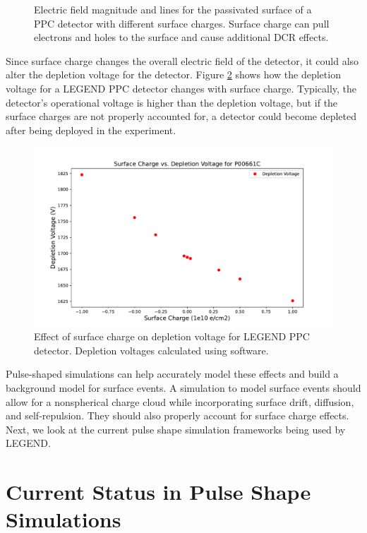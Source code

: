 \begin{figure}
\caption{Electric field magnitude and lines for the passivated surface of a PPC detector with different surface charges. Surface charge can pull electrons and holes to the surface and cause additional DCR effects.}
\label{ch3_fig_surface_field_sc0}
\end{figure}


Since surface charge changes the overall electric field of the detector, it could also alter the depletion voltage for the detector. Figure \ref{ch3_fig_deplection_sc} shows how the depletion voltage for a LEGEND PPC detector changes with surface charge. Typically, the detector's operational voltage is higher than the depletion voltage, but if the surface charges are not properly accounted for, a detector could become depleted after being deployed in the experiment.

\begin{figure}[!htb]
\centering
  \includegraphics[width=0.99\linewidth]{ch3/figs/deplep_sc.pdf}
 \caption{Effect of surface charge on depletion voltage for LEGEND PPC detector. Depletion voltages calculated using {\siggen} software.}
\label{ch3_fig_deplection_sc}
  \end{figure}

Pulse-shaped simulations can help accurately model these effects and build a background model for surface events. A simulation to model surface events should allow for a nonspherical charge cloud while incorporating surface drift, diffusion, and self-repulsion. They should also properly account for surface charge effects. Next, we look at the current pulse shape simulation frameworks being used by LEGEND.

\section{Current Status in Pulse Shape Simulations}

